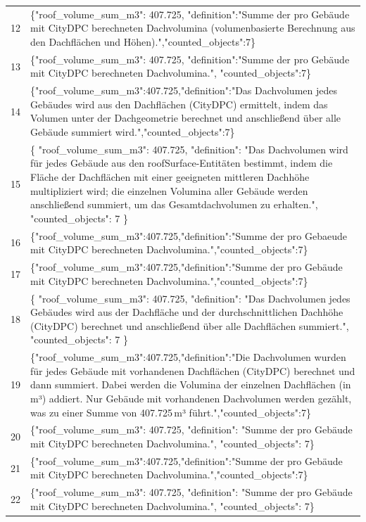 \documentclass[a4paper,11pt]{article}
\begin{document}
\begin{table}[ht]
\begin{tabular}{r p{12cm}}
12 & \{"roof\_volume\_sum\_m3": 407.725, "definition":"Summe der pro Gebäude mit CityDPC berechneten Dachvolumina (volumenbasierte Berechnung aus den Dachflächen und Höhen).","counted\_objects":7\} \\
13 & \{"roof\_volume\_sum\_m3": 407.725, "definition":"Summe der pro Gebäude mit CityDPC berechneten Dachvolumina.", "counted\_objects":7\} \\
14 & \{"roof\_volume\_sum\_m3":407.725,"definition":"Das Dachvolumen jedes Gebäudes wird aus den Dachflächen (CityDPC) ermittelt, indem das Volumen unter der Dachgeometrie berechnet und anschließend über alle Gebäude summiert wird.","counted\_objects":7\} \\
15 & \{
  "roof\_volume\_sum\_m3": 407.725,
  "definition": "Das Dachvolumen wird für jedes Gebäude aus den roofSurface-Entitäten bestimmt, indem die Fläche der Dachflächen mit einer geeigneten mittleren Dachhöhe multipliziert wird; die einzelnen Volumina aller Gebäude werden anschließend summiert, um das Gesamtdachvolumen zu erhalten.",
  "counted\_objects": 7
\} \\
16 & \{"roof\_volume\_sum\_m3":407.725,"definition":"Summe der pro Gebaeude mit CityDPC berechneten Dachvolumina.","counted\_objects":7\} \\
17 & \{"roof\_volume\_sum\_m3":407.725,"definition":"Summe der pro Gebäude mit CityDPC berechneten Dachvolumina.","counted\_objects":7\} \\
18 & \{
  "roof\_volume\_sum\_m3": 407.725,
  "definition": "Das Dachvolumen jedes Gebäudes wird aus der Dachfläche und der durchschnittlichen Dachhöhe (CityDPC) berechnet und anschließend über alle Dachflächen summiert.",
  "counted\_objects": 7
\} \\
19 & \{"roof\_volume\_sum\_m3":407.725,"definition":"Die Dachvolumen wurden für jedes Gebäude mit vorhandenen Dachflächen (CityDPC) berechnet und dann summiert. Dabei werden die Volumina der einzelnen Dachflächen (in m³) addiert. Nur Gebäude mit vorhandenen Dachvolumen werden gezählt, was zu einer Summe von 407.725 m³ führt.","counted\_objects":7\} \\
20 & \{"roof\_volume\_sum\_m3": 407.725, "definition": "Summe der pro Gebäude mit CityDPC berechneten Dachvolumina.", "counted\_objects": 7\} \\
21 & \{"roof\_volume\_sum\_m3":407.725,"definition":"Summe der pro Gebäude mit CityDPC berechneten Dachvolumina.","counted\_objects":7\} \\
22 & \{"roof\_volume\_sum\_m3": 407.725, "definition": "Summe der pro Gebäude mit CityDPC berechneten Dachvolumina.", "counted\_objects": 7\} \\

\end{tabular}
\end{table}
\end{document}
